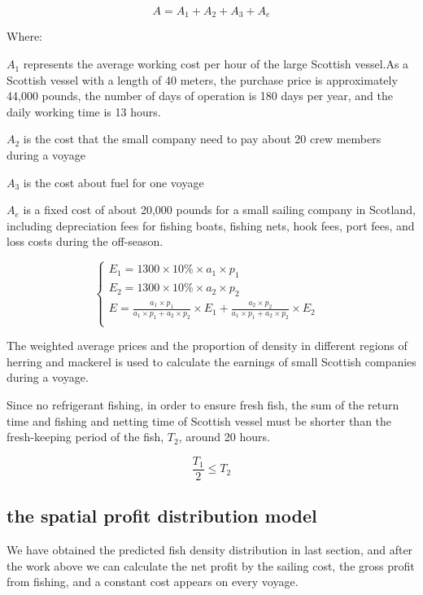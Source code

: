 \documentclass{mcmthesis}
\begin{document}
\begin{equation}\label{8}
A=A_1+A_2+A_3+A_e
\end{equation}

Where:

$A_1$ represents the average working cost per hour of the large Scottish vessel.As a Scottish vessel with a length of 40 meters, the purchase price is approximately 44,000 pounds, the number of days of operation is 180 days per year, and the daily working time is 13 hours.

$A_2$ is the cost that the small company need to pay about 20 crew members during a voyage

$A_3$ is the cost about fuel for one voyage

$A_e$ is a fixed cost of about 20,000 pounds for a small sailing company in Scotland, including depreciation fees for fishing boats, fishing nets, hook fees, port fees, and loss costs during the off-season.
 


\begin{equation}
\left\{
\begin{array}{lr}

E_1=1300 \times 10\% \times a_1 \times p_1 &\\
E_2=1300 \times 10\% \times a_2 \times p_2 &\\
E= \frac{a_1 \times p_1}{a_1 \times p_1+ a_2 \times p_2} \times E_1 + \frac{a_2 \times p_2}{a_1 \times p_1+ a_2 \times p_2} \times E_2\\

\end{array}
\right.
\end{equation}

The weighted average prices and the proportion of density in different regions of herring and mackerel  is used to calculate the earnings of small Scottish companies during a voyage. 

Since no refrigerant fishing, in order to ensure fresh fish, the sum of the return time and fishing and netting time  of Scottish vessel must be shorter than the fresh-keeping period of the fish, $T_2$, around 20 hours.

\begin{equation}\label{10}
\frac{T_1}{2}\leq T_2
\end{equation}



\subsection{the spatial profit distribution model}
  We have obtained the predicted fish density distribution in last section, and after the work above we can calculate the net profit by the sailing cost, the gross profit from fishing, and a constant cost appears on every voyage.
  
\end{document}
